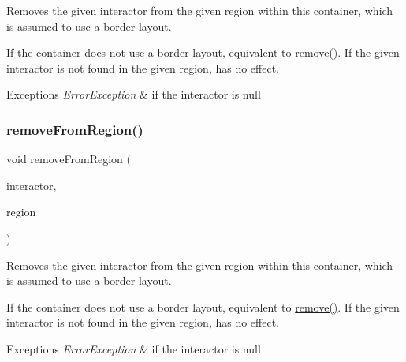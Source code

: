 Removes the given interactor from the given region within this container, which is assumed to use a border layout. 

If the container does not use a border layout, equivalent to \mbox{\hyperlink{classGContainer_a1c12b1fde5c2ef10d79d4ee51e670efa}{remove()}}. If the given interactor is not found in the given region, has no effect. 
\begin{DoxyExceptions}{Exceptions}
{\em Error\+Exception} & if the interactor is null \\
\hline
\end{DoxyExceptions}
\mbox{\label{classGContainer_a16268c8344a5a5d9b10bde95764112d1}} 
\subsubsection{\texorpdfstring{remove\+From\+Region()}{removeFromRegion()}\hspace{0.1cm}{\footnotesize\ttfamily [2/6]}}
{\footnotesize\ttfamily void remove\+From\+Region (\begin{DoxyParamCaption}\item[{\mbox{\hyperlink{classGInteractor}{G\+Interactor}} $\ast$}]{interactor,  }\item[{const std\+::string \&}]{region }\end{DoxyParamCaption})\hspace{0.3cm}{\ttfamily [virtual]}}



Removes the given interactor from the given region within this container, which is assumed to use a border layout. 

If the container does not use a border layout, equivalent to \mbox{\hyperlink{classGContainer_a1c12b1fde5c2ef10d79d4ee51e670efa}{remove()}}. If the given interactor is not found in the given region, has no effect. 
\begin{DoxyExceptions}{Exceptions}
{\em Error\+Exception} & if the interactor is null \\
\hline
\end{DoxyExceptions}
\mbox{\label{classGContainer_afee7b65f917c4f6a0fdb1c8ea75406a5}} 
